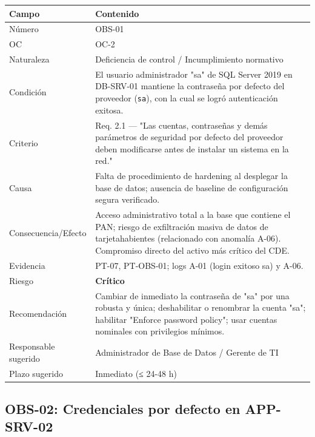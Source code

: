 \documentclass[11pt,a4paper]{article}
\begin{document}
\begin{tabularx}{\textwidth}{P{5cm}L}
\toprule
\textbf{Campo} & \textbf{Contenido} \\
\midrule
Número & OBS-01 \\
OC & OC-2 \\
Naturaleza & Deficiencia de control / Incumplimiento normativo \\
Condición & El usuario administrador "sa" de SQL Server 2019 en DB-SRV-01 mantiene la contraseña por defecto del proveedor (\texttt{sa}), con la cual se logró autenticación exitosa. \\
Criterio & Req. 2.1 — "Las cuentas, contraseñas y demás parámetros de seguridad por defecto del proveedor deben modificarse antes de instalar un sistema en la red." \\
Causa & Falta de procedimiento de hardening al desplegar la base de datos; ausencia de baseline de configuración segura verificado. \\
Consecuencia/Efecto & Acceso administrativo total a la base que contiene el PAN; riesgo de exfiltración masiva de datos de tarjetahabientes (relacionado con anomalía A-06). Compromiso directo del activo más crítico del CDE. \\
Evidencia & PT-07, PT-OBS-01; logs A-01 (login exitoso sa) y A-06. \\
Riesgo & \textbf{Crítico} \\
Recomendación & Cambiar de inmediato la contraseña de "sa" por una robusta y única; deshabilitar o renombrar la cuenta "sa"; habilitar "Enforce password policy"; usar cuentas nominales con privilegios mínimos. \\
Responsable sugerido & Administrador de Base de Datos / Gerente de TI \\
Plazo sugerido & Inmediato (≤ 24-48 h) \\
\bottomrule
\end{tabularx}

\subsection{OBS-02: Credenciales por defecto en APP-SRV-02}
\end{document}
